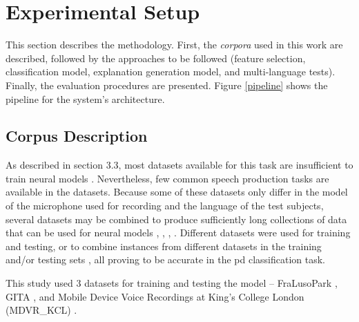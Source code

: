 
\chapter{Experimental Setup}
\label{ch:adipisci}



This section describes the methodology. First, the \textit{corpora} used in this work are described, followed by the approaches to be followed (feature selection, classification model, explanation generation model, and multi-language tests). Finally, the evaluation procedures are presented. Figure \ref{pipeline} shows the pipeline for the system's architecture. 

\section{Corpus Description}

As described in section 3.3, most datasets available for this task are insufficient to train neural models \cite{underfitting_small_datasets}. Nevertheless, few common speech production tasks are available in the datasets. Because some of these datasets only differ in
the model of the microphone used for recording and the language of the test subjects, several datasets may be combined to produce sufficiently long collections of data that can be used for neural models \cite{parkinson_braga}, \cite{parkinson_acoustic_despotovic}, \cite{parkinson_phonemic_relevance}, \cite{x_vector_parkinson}. Different datasets were used for training and testing, or to combine instances from different datasets in the training and/or testing sets \cite{parkinson_three_languages}, all proving to be accurate in the \gls{pd} classification task.

This study used 3 datasets for training and testing the model -- FraLusoPark \cite{fralusopark}, GITA \cite{GITA}, and Mobile Device Voice Recordings at King's College London (MDVR\_KCL) \cite{MDVR}.

